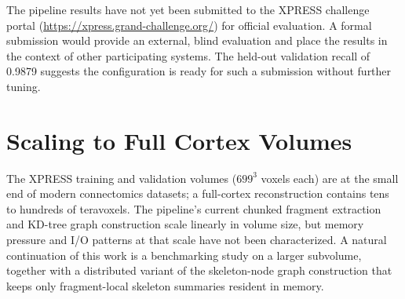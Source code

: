 The pipeline results have not yet been submitted to the XPRESS challenge portal
(\url{https://xpress.grand-challenge.org/}) for official evaluation. A formal
submission would provide an external, blind evaluation and place the results
in the context of other participating systems. The held-out validation recall
of 0.9879 suggests the configuration is ready for such a submission without
further tuning.

\section{Scaling to Full Cortex Volumes}

The XPRESS training and validation volumes ($699^3$ voxels each) are at the
small end of modern connectomics datasets; a full-cortex reconstruction contains
tens to hundreds of teravoxels.  The pipeline's current chunked fragment
extraction and KD-tree graph construction scale linearly in volume size, but
memory pressure and I/O patterns at that scale have not been characterized.
A natural continuation of this work is a benchmarking study on a larger
subvolume, together with a distributed variant of the skeleton-node graph
construction that keeps only fragment-local skeleton summaries resident in
memory.

